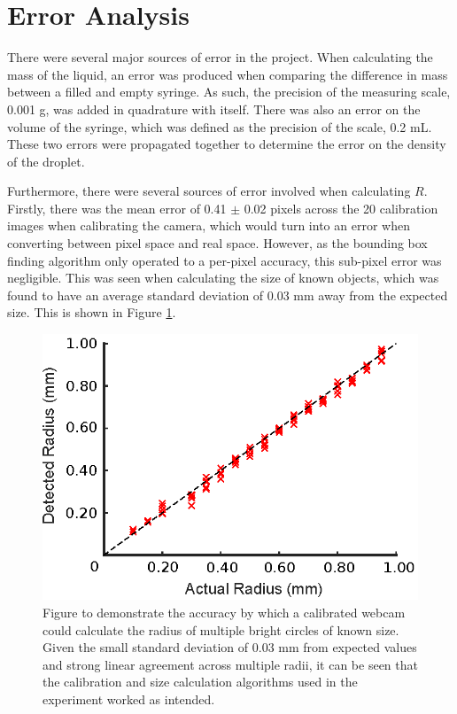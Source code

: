 \documentclass{physics_article_B}
\begin{document}
\section{Error Analysis} 
    
    There were several major sources of error in the project. When calculating the mass of the liquid, an error was produced when comparing the difference in mass between a filled and empty syringe. As such, the precision of the measuring scale, 0.001 g, was added in quadrature with itself. There was also an error on the volume of the syringe, which was defined as the precision of the scale, 0.2 mL. These two errors were propagated together to determine the error on the density of the droplet.
    
    Furthermore, there were several sources of error involved when calculating $R$. Firstly, there was the mean error of 0.41 $\pm$ 0.02 pixels across the 20 calibration images when calibrating the camera, which would turn into an error when converting between pixel space and real space. However, as the bounding box finding algorithm only operated to a per-pixel accuracy, this sub-pixel error was negligible. This was seen when calculating the size of known objects, which was found to have an average standard deviation of 0.03 mm away from the expected size. This is shown in Figure \ref{fig:calib:error}. 
        
            \begin{figure}[H]
                \centering
                \hspace*{-1cm}\includegraphics{Figures/CameraCalib.eps}
                \caption{Figure to demonstrate the accuracy by which a calibrated webcam could calculate the radius of multiple bright circles of known size. Given the small standard deviation of 0.03 mm from expected values and strong linear agreement across multiple radii, it can be seen that the calibration and size calculation algorithms used in the experiment worked as intended.}
                \label{fig:calib:error}
            \end{figure}
    
\end{document}
